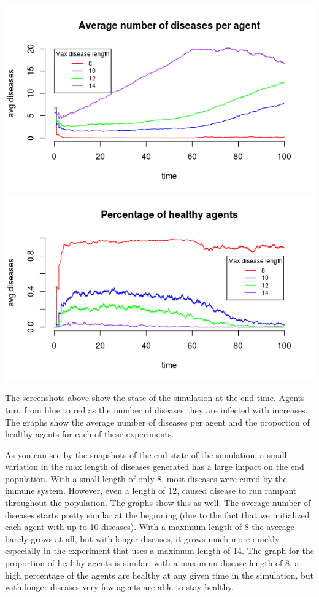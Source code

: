 \documentclass[12pt,a4paper]{article} %
\begin{document}
    \includegraphics[scale=0.5]{avg-diseases-length}
    \includegraphics[scale=0.5]{healthy-agents-length}
    
    The screenshots above show the state of the simulation at the end time. Agents turn from blue to red as the number of diseases
    they are infected with increases. The graphs show the average number of diseases per agent and the proportion of healthy
    agents for each of these experiments.
    
    As you can see by the snapshots of the end state of the simulation, a small variation in the max length of diseases generated has a large impact on the end population. With a small length of only 8, most diseases were cured by the immune system. However, even a length of 12, caused disease to run rampant throughout the population.
    The graphs show this as well. The average number of diseases starts pretty similar at the beginning (due to the fact that we
    initialized each agent with up to 10 diseases). With a maximum length of 8 the average barely grows at all, but with
    longer diseases, it grows much more quickly, especially in the experiment that uses a maximum length of 14. The graph for the
    proportion of healthy agents is similar: with a maximum disease length of 8, a high percentage of the agents are healthy at any
    given time in the simulation, but with longer diseases very few agents are able to stay healthy.
    
\end{document}

